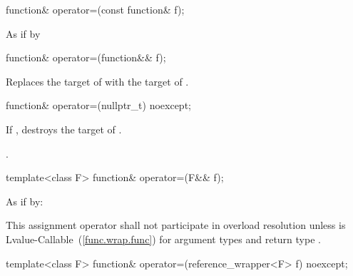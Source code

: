 %
\begin{itemdecl}
function& operator=(const function& f);
\end{itemdecl}

\begin{itemdescr}
\pnum
\effects As if by 

\pnum
\returns {}
\end{itemdescr}

%
\begin{itemdecl}
function& operator=(function&& f);
\end{itemdecl}

\begin{itemdescr}
\pnum
\effects Replaces the target of 
with the target of .

\pnum
\returns {}
\end{itemdescr}

%
\begin{itemdecl}
function& operator=(nullptr_t) noexcept;
\end{itemdecl}

\begin{itemdescr}
\pnum\effects If , destroys the target of .

\pnum\postcondition {}.

\pnum\returns {}
\end{itemdescr}

%
\begin{itemdecl}
template<class F> function& operator=(F&& f);
\end{itemdecl}

\begin{itemdescr}
\pnum\effects As if by: 

\pnum\returns {}

\pnum\remarks This assignment operator shall not participate in overload
resolution unless  is
Lvalue-Callable~(\ref{func.wrap.func}) for argument types  and
return type .
\end{itemdescr}

%
\begin{itemdecl}
template<class F> function& operator=(reference_wrapper<F> f) noexcept;
\end{itemdecl}

